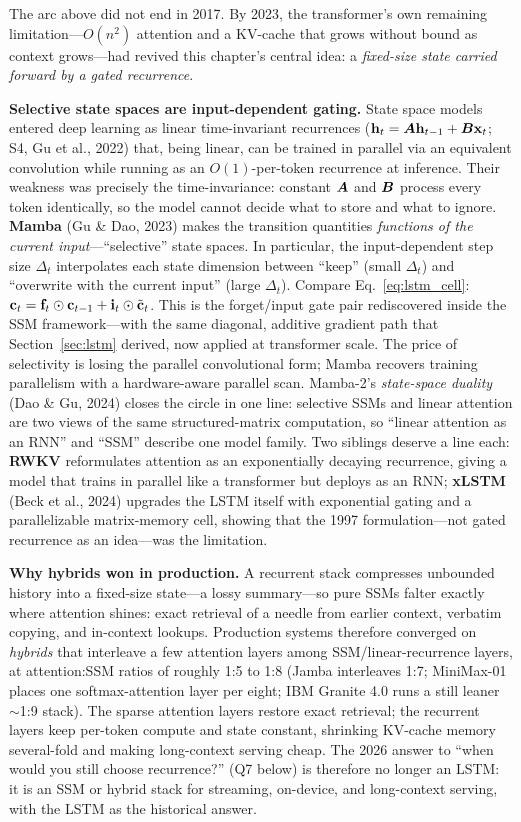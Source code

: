 The arc above did not end in 2017.  By 2023, the transformer's own
remaining limitation---$O(n^2)$ attention and a KV-cache that grows without
bound as context grows---had revived this chapter's central idea: a
\emph{fixed-size state carried forward by a gated recurrence}.

\textbf{Selective state spaces are input-dependent gating.}
State space models entered deep learning as linear time-invariant
recurrences ($\mathbf{h}_t = \bm{A} \mathbf{h}_{t-1} + \bm{B} \mathbf{x}_t$; S4, Gu et al., 2022)
that, being linear, can be trained in parallel via an equivalent
convolution while running as an $O(1)$-per-token recurrence at inference.
Their weakness was precisely the time-invariance: constant $\bm{A}$ and
$\bm{B}$ process every token identically, so the model cannot decide what to
store and what to ignore.  \textbf{Mamba} (Gu \& Dao, 2023) makes the
transition quantities \emph{functions of the current input}---``selective''
state spaces.  In particular, the input-dependent step size
$\Delta_t$ interpolates each state dimension between ``keep'' (small
$\Delta_t$) and ``overwrite with the current input'' (large $\Delta_t$).
Compare Eq.~\eqref{eq:lstm_cell}:
$\mathbf{c}_t = \mathbf{f}_t \odot \mathbf{c}_{t-1} + \mathbf{i}_t \odot \tilde{\mathbf{c}}_t$.
This is the forget/input gate pair rediscovered inside the SSM
framework---with the same diagonal, additive gradient path that
Section~\ref{sec:lstm} derived, now applied at transformer scale.  The
price of selectivity is losing the parallel convolutional form; Mamba
recovers training parallelism with a hardware-aware parallel scan.
Mamba-2's \emph{state-space duality} (Dao \& Gu, 2024) closes the circle
in one line: selective SSMs and linear attention are two views of the same
structured-matrix computation, so ``linear attention as an RNN'' and
``SSM'' describe one model family.  Two siblings deserve a line each:
\textbf{RWKV} reformulates attention as an exponentially decaying
recurrence, giving a model that trains in parallel like a transformer but
deploys as an RNN; \textbf{xLSTM} (Beck et al., 2024) upgrades the LSTM
itself with exponential gating and a parallelizable matrix-memory cell,
showing that the 1997 formulation---not gated recurrence as an idea---was
the limitation.

\textbf{Why hybrids won in production.}
A recurrent stack compresses unbounded history into a fixed-size
state---a lossy summary---so pure SSMs falter exactly where attention
shines: exact retrieval of a needle from earlier context, verbatim
copying, and in-context lookups.  Production systems therefore converged
on \emph{hybrids} that interleave a few attention layers among
SSM/linear-recurrence layers, at attention:SSM ratios of roughly 1:5 to
1:8 (Jamba interleaves 1:7; MiniMax-01 places one softmax-attention layer
per eight; IBM Granite 4.0 runs a still leaner $\sim$1:9 stack).  The
sparse attention layers restore exact retrieval; the recurrent layers keep
per-token compute and state constant, shrinking KV-cache memory several-fold
and making long-context serving cheap.  The 2026 answer to ``when would you
still choose recurrence?'' (Q7 below) is therefore no longer an LSTM: it is
an SSM or hybrid stack for streaming, on-device, and long-context serving,
with the LSTM as the historical answer.

